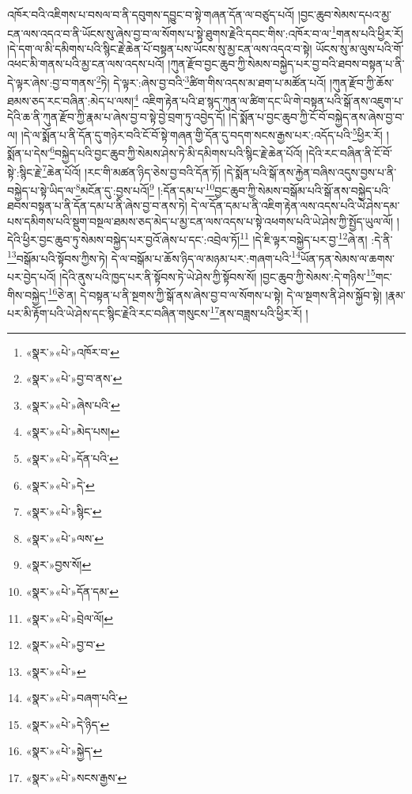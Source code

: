 འཁོར་བའི་འཇིགས་པ་བསལ་བ་ནི་དབུགས་དབྱུང་བ་སྟེ་གཞན་དོན་ལ་བཙུད་པའོ། །བྱང་ཆུབ་སེམས་དཔའ་མྱ་ངན་ལས་འདའ་བ་ནི་ཡོངས་སུ་ཞེས་བྱ་བ་ལ་སོགས་པ་སྟེ་ཐུགས་རྗེའི་དབང་གིས་:འཁོར་བ་ལ་\footnote{«སྣར་»«པེ་»འཁོར་བ་}གནས་པའི་ཕྱིར་རོ། །དེ་དག་ལ་མི་དམིགས་པའི་སྙིང་རྗེ་ཆེན་པོ་བསྟན་པས་ཡོངས་སུ་མྱ་ངན་ལས་འདའ་བ་སྟེ། ཡོངས་སུ་མ་ལུས་པའི་གོ་འཕང་མི་གནས་པའི་མྱ་ངན་ལས་འདས་པའོ། །ཀུན་རྫོབ་བྱང་ཆུབ་ཀྱི་སེམས་བསྐྱེད་པར་བྱ་བའི་ཐབས་བསྟན་པ་ནི་དེ་ལྟར་ཞེས་:བྱ་བ་གནས་\footnote{«སྣར་»«པེ་»བྱ་བ་ནས་}ཏེ། དེ་ལྟར་:ཞེས་བྱ་བའི་\footnote{«སྣར་»«པེ་»ཞེས་པའི་}ཚིག་གིས་འདས་མ་ཐག་པ་མཚོན་པའོ། །ཀུན་རྫོབ་ཀྱི་ཆོས་ཐམས་ཅད་རང་བཞིན་:མེད་པ་ལས།\footnote{«སྣར་»«པེ་»མེད་པས།} འཇིག་རྟེན་པའི་ཐ་སྙད་ཀུན་ལ་ཚིག་དང་ཡི་གེ་བསྟན་པའི་སྒོ་ནས་འཇུག་པ་དེའི་ཆ་ནི་ཀུན་རྫོབ་ཀྱི་རྣམ་པ་ཞེས་བྱ་བ་སྟེ་བྱེ་བྲག་ཏུ་འབྱེད་དོ། །དེ་སྨོན་པ་བྱང་ཆུབ་ཀྱི་ངོ་བོ་བསྐྱེད་ནས་ཞེས་བྱ་བ་ལ། །དེ་ལ་སྨོན་པ་ནི་དོན་དུ་གཉེར་བའི་ངོ་བོ་སྟེ་གཞན་གྱི་དོན་དུ་བདག་སངས་རྒྱས་པར་:འདོད་པའི་\footnote{«སྣར་»«པེ་»དོན་པའི་}ཕྱིར་རོ། །སྨོན་པ་དེས་\footnote{«སྣར་»«པེ་»དེ་}བསྐྱེད་པའི་བྱང་ཆུབ་ཀྱི་སེམས་ཤེས་ཏེ་མི་དམིགས་པའི་སྙིང་རྗེ་ཆེན་པོའོ། །དེའི་རང་བཞིན་ནི་ངོ་བོ་སྟེ་:སྙིང་རྗེ་\footnote{«སྣར་»«པེ་»སྙིང་}ཆེན་པོའོ། །རང་གི་མཚན་ཉིད་ཅེས་བྱ་བའི་དོན་ཏོ། །དེ་སྨོན་པའི་སྒོ་ནས་རྐྱེན་བཞིས་འདུས་བྱས་པ་ནི་བསྐྱེད་པ་སྟེ་ཡིད་ལ་\footnote{«སྣར་»«པེ་»ལས་}མངོན་དུ་:བྱས་པའོ།\footnote{«སྣར་»བྱས་སོ།} །:དོན་དམ་པ་\footnote{«སྣར་»«པེ་»དོན་དམ་}བྱང་ཆུབ་ཀྱི་སེམས་བསྒོམ་པའི་སྒོ་ནས་བསྐྱེད་པའི་ཐབས་བསྟན་པ་ནི་དོན་དམ་པ་ནི་ཞེས་བྱ་བ་ནས་ཏེ། དེ་ལ་དོན་དམ་པ་ནི་འཇིག་རྟེན་ལས་འདས་པའི་ཡེ་ཤེས་དམ་པས་དམིགས་པའི་སྡུག་བསྔལ་ཐམས་ཅད་མེད་པ་མྱ་ངན་ལས་འདས་པ་སྟེ་འཕགས་པའི་ཡེ་ཤེས་ཀྱི་སྤྱོད་ཡུལ་ལོ། །དེའི་ཕྱིར་བྱང་ཆུབ་ཏུ་སེམས་བསྐྱེད་པར་བྱའོ་ཞེས་པ་དང་:འབྲེལ་ཏོ།\footnote{«སྣར་»«པེ་»བྲེལ་ལོ།} །དེ་ཇི་ལྟར་བསྐྱེད་པར་བྱ་\footnote{«སྣར་»«པེ་»བྱ་བ་}ཞེ་ན། :དེ་ནི་\footnote{«སྣར་»«པེ་»}བསྒོམ་པའི་སྟོབས་ཀྱིས་ཏེ། དེ་ལ་བསྒོམ་པ་ཆོས་ཉིད་ལ་མཉམ་པར་:གཞག་པའི་\footnote{«སྣར་»«པེ་»བཞག་པའི་}ཡོན་ཏན་སེམས་ལ་ཆགས་པར་བྱེད་པའོ། །དེའི་ནུས་པའི་ཁྱད་པར་ནི་སྟོབས་ཏེ་ཡེ་ཤེས་ཀྱི་སྟོབས་སོ། །བྱང་ཆུབ་ཀྱི་སེམས་:དེ་གཉིས་\footnote{«སྣར་»«པེ་»དེ་ཉིད་}གང་གིས་བསྐྱེད་\footnote{«སྣར་»«པེ་»སྐྱེད་}ཅེ་ན། དེ་བསྟན་པ་ནི་སྔགས་ཀྱི་སྒོ་ནས་ཞེས་བྱ་བ་ལ་སོགས་པ་སྟེ། དེ་ལ་སྔགས་ནི་ཤེས་སྐྱོབ་སྟེ། །རྣམ་པར་མི་རྟོག་པའི་ཡེ་ཤེས་དང་སྙིང་རྗེའི་རང་བཞིན་གསུངས་\footnote{«སྣར་»«པེ་»སངས་རྒྱས་}ནས་བཟླས་པའི་ཕྱིར་རོ། །
